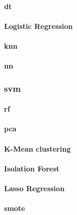 \documentclass[../../main.tex]{subfiles}
\begin{document}
\vspace{8pt}
\paragraph{\acrfull{dt}}


\vspace{8pt}
\paragraph{Logistic Regression}


\vspace{8pt}
\paragraph{\acrfull{knn}}


\vspace{8pt}
\paragraph{\acrfull{nn}}


\vspace{8pt}
\subsubsection{\acrfull{svm}}


\vspace{8pt}
\paragraph{\acrfull{rf}}


\vspace{8pt}
\paragraph{\acrfull{pca}}


\vspace{8pt}
\paragraph{K-Mean clustering}


\vspace{8pt}
\paragraph{Isolation Forest}


\vspace{8pt}
\paragraph{Lasso Regression}


\vspace{8pt}
\paragraph{\acrfull{smote}}

\end{document}
